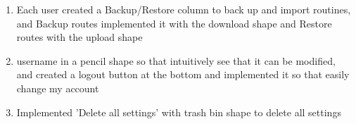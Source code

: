 \documentclass[11pt, conference]{IEEEtran}
\begin{document}
\begin{enumerate}[label=\arabic*.]
\begin{enumerate}[label=\arabic*]
\begin{enumerate}[label=\alph*]
\begin{enumerate}
            \item Each user created a Backup/Restore column to back up and import routines, and Backup routes implemented it with the download shape and Restore routes with the upload shape\\

            \item username in a pencil shape so that intuitively see that it can be modified, and created a logout button at the bottom and implemented it so that easily change my account\\

            \item Implemented 'Delete all settings' with trash bin shape to delete all settings
    \end{enumerate}
\end{enumerate}
\end{enumerate}


\end{enumerate}
\end{document}
